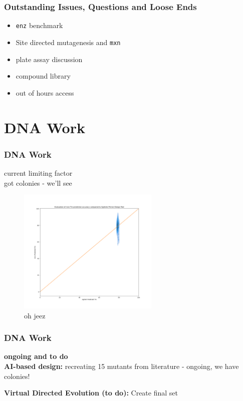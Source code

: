 \documentclass[10pt]{beamer}
\begin{document}
\begin{frame}
	\frametitle{\textbf{Outstanding Issues, Questions and Loose Ends}}
	\begin{itemize}
		\item \texttt{enz} benchmark
		\item Site directed mutagenesis and \texttt{mxn}
		\item plate assay discussion
		\item compound library
		\item out of hours access
	\end{itemize}
\end{frame}

\section{DNA Work}
\begin{frame}
	\frametitle{\textbf{DNA Work}}
	current limiting factor \\
	got colonies - we'll see \\
	\begin{figure}
		\includegraphics[width=0.6\textwidth]{figs/mxn.png}
		\caption{\label{mxn} oh jeez}
	\end{figure}
\end{frame}

\begin{frame}
	\frametitle{\textbf{DNA Work}}
	\textbf{ongoing and to do} \\ 
	\textbf{AI-based design:} recreating 15 mutants from literature - ongoing, we have colonies!
	\par
	\textbf{Virtual Directed Evolution (to do):} Create final set
\end{frame}
\end{document}
